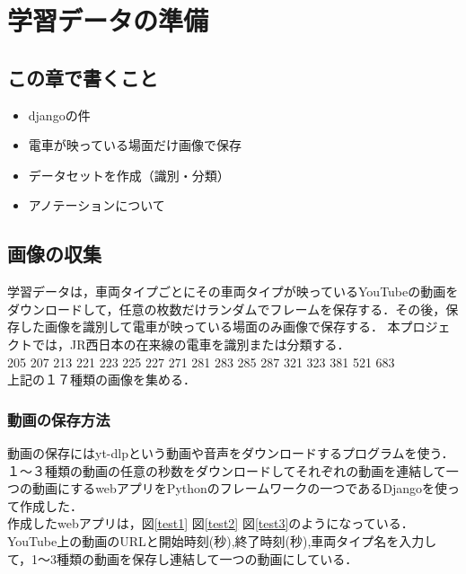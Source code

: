 

\chapter{学習データの準備}\label{genri}
\section{この章で書くこと}
\begin{itemize}
	\item djangoの件
	\item 電車が映っている場面だけ画像で保存
	\item データセットを作成（識別・分類）
	\item アノテーションについて
\end{itemize}

\section{画像の収集}
学習データは，車両タイプごとにその車両タイプが映っているYouTubeの動画をダウンロードして，任意の枚数だけランダムでフレームを保存する．その後，保存した画像を識別して電車が映っている場面のみ画像で保存する．
本プロジェクトでは，JR西日本の在来線の電車を識別または分類する．\\
205  207  213  221  223  225  227  271  281  283  285  287  321  323  381  521  683 \\
上記の１７種類の画像を集める．
\subsection{動画の保存方法}
動画の保存にはyt-dlpという動画や音声をダウンロードするプログラムを使う．
１〜３種類の動画の任意の秒数をダウンロードしてそれぞれの動画を連結して一つの動画にするwebアプリをPythonのフレームワークの一つであるDjangoを使って作成した．\\
	作成したwebアプリは，図\ref{test1} 図\ref{test2}  図\ref{test3}のようになっている．
	YouTube上の動画のURLと開始時刻(秒),終了時刻(秒),車両タイプ名を入力して，1〜3種類の動画を保存し連結して一つの動画にしている．
	
